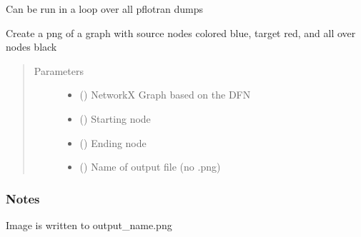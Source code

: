 \documentclass[letterpaper,10pt,english]{sphinxmanual}
\begin{document}
\begin{fulllineitems}
\begin{fulllineitems}
Can be run in a loop over all pflotran dumps

\end{fulllineitems}


\begin{fulllineitems}
\label{\detokenize{pydfnworks:pydfnworks.general.dfnworks.DFNWORKS.plot_graph}}
Create a png of a graph with source nodes colored blue, target red, and all over nodes black
\begin{quote}\begin{description}
\item[{Parameters}] \leavevmode\begin{itemize}
\item {} 
 () \textendash{} NetworkX Graph based on the DFN

\item {} 
 () \textendash{} Starting node

\item {} 
 () \textendash{} Ending node

\item {} 
 () \textendash{} Name of output file (no .png)

\end{itemize}

\end{description}\end{quote}
\subsubsection*{Notes}

Image is written to output\_name.png

\end{fulllineitems}



\end{fulllineitems}
\end{document}
